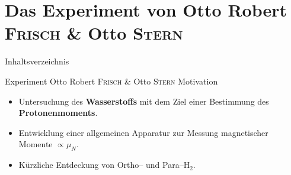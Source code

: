 \documentclass[t,9pt]{beamer}
\newcommand{\highlight}[3]{ \begin{textblock*}{#1}(#2,#3) \begin{tcolorbox} [enhanced,opacityfill=.1,colback=blue] \end{tcolorbox} \end{textblock*} } %
\begin{document}
        \section{Das Experiment von Otto Robert \textsc{Frisch} \& Otto \textsc{Stern}} 

        \begin{frame}{Inhaltsverzeichnis}
                \tableofcontents[currentsection]
        \end{frame}


        \begin{frame}{Experiment Otto Robert \textsc{Frisch} \& Otto \textsc{Stern}}
                Motivation
                \begin{itemize}
                        \item Untersuchung des \textbf{Wasserstoffs} mit dem Ziel einer Bestimmung des \textbf{Protonenmoments}. %
                        \item Entwicklung einer allgemeinen Apparatur zur Messung magnetischer Momente $\propto \mu _N$.
                        \item Kürzliche Entdeckung von Ortho-- und Para--$\text{H}_2$.
                \end{itemize}
                \hfill\tiny\cite{FrischStern1933}\normalsize
        \end{frame}

\end{document}
